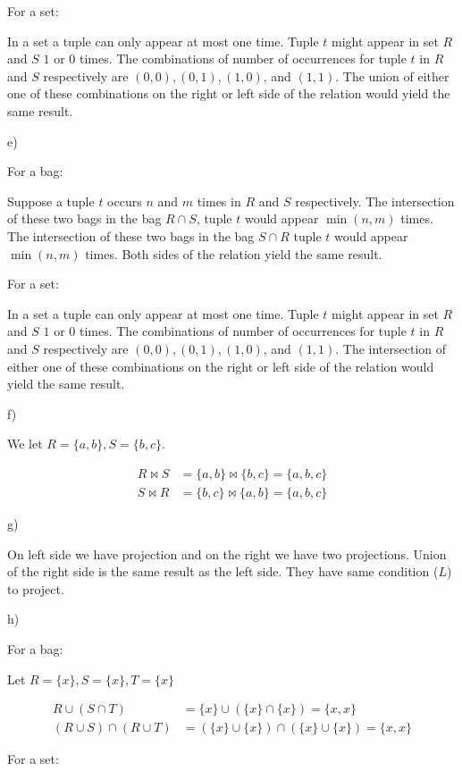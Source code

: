 \documentclass[../../main.tex]{subfiles}
\begin{document}
For a set:

In a set a tuple can only appear at most one time. Tuple $t$
might appear in set $R$ and $S$ $1$ or $0$ times. The
combinations of number of occurrences for tuple $t$
in $R$ and $S$ respectively are $(0,0), (0,1), (1,0)$,
and $(1,1)$. The union of either one of these
combinations on the right or left side of the relation
would yield the same result.

e)

For a bag:

Suppose a tuple $t$ occurs $n$ and $m$ times in $R$ and $S$
respectively. The intersection of these two bags in the bag $R \cap S$,
tuple $t$ would appear $\min(n, m)$ times. The intersection
of these two bags in the bag $S \cap R$ tuple $t$ would appear
$\min(n, m)$ times. Both sides of the relation yield the same result.

For a set:

In a set a tuple can only appear at most one time. Tuple $t$
might appear in set $R$ and $S$ $1$ or $0$ times. The
combinations of number of occurrences for tuple $t$
in $R$ and $S$ respectively are $(0,0), (0,1), (1,0)$,
and $(1,1)$. The intersection of either one of these
combinations on the right or left side of the relation
would yield the same result.

f)

We let $R = \{a, b\}, S = \{b, c\}$.

\begin{align*}
  R \bowtie S &= \{a, b\} \bowtie \{b, c\} = \{a, b, c\} \\
  S \bowtie R &= \{b, c\} \bowtie \{a, b\} = \{a, b, c\}
\end{align*}

g)

On left side we have projection and on the right we
have two projections. Union of the right side is
the same result as the left side. They have
same condition ($L$) to project.

h)

For a bag:

Let $R = \{x\}, S= \{x\}, T = \{x\}$

\begin{align*}
  R \cup (S \cap T) &=
    \{x\} \cup (\{x\} \cap \{x\}) = \{x, x\}\\
  (R \cup S) \cap (R \cup T) &=
    (\{x\} \cup \{x\}) \cap (\{x\} \cup \{x\}) = \{x, x\}
\end{align*}

For a set:
\end{document}
